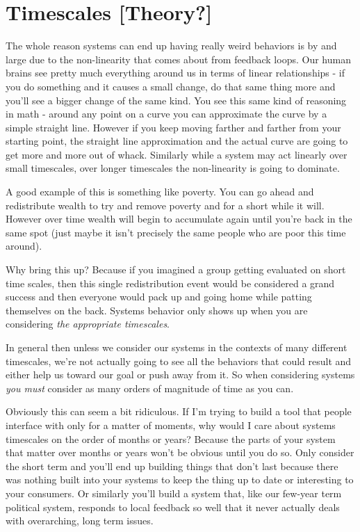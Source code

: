 \documentclass[11pt,a5paper]{book}
\begin{document}
\section{Timescales [Theory?]}
The whole reason systems can end up having really weird behaviors is by and large due to the non-linearity that comes about from feedback loops. Our human brains see pretty much everything around us in terms of linear relationships - if you do something and it causes a small change, do that same thing more and you'll see a bigger change of the same kind. You see this same kind of reasoning in math - around any point on a curve you can approximate the curve by a simple straight line. However if you keep moving farther and farther from your starting point, the straight line approximation and the actual curve are going to get more and more out of whack. Similarly while a system may act linearly over small timescales, over longer timescales the non-linearity is going to dominate.
\newline

A good example of this is something like poverty. You can go ahead and redistribute wealth to try and remove poverty and for a short while it will. However over time wealth will begin to accumulate again until you're back in the same spot (just maybe it isn't precisely the same people who are poor this time around). 
\newline

Why bring this up? Because if you imagined a group getting evaluated on short time scales, then this single redistribution event would be considered a grand success and then everyone would pack up and going home while patting themselves on the back. Systems behavior only shows up when you are considering \textit{the appropriate timescales}. 
\newline

In general then unless we consider our systems in the contexts of many different timescales, we're not actually going to see all the behaviors that could result and either help us toward our goal or push away from it. So when considering systems \textit{you must} consider as many orders of magnitude of time as you can.
\newline

Obviously this can seem a bit ridiculous. If I'm trying to build a tool that people interface with only for a matter of moments, why would I care about systems timescales on the order of months or years? Because the parts of your system that matter over months or years won't be obvious until you do so. Only consider the short term and you'll end up building things that don't last because there was nothing built into your systems to keep the thing up to date or interesting to your consumers. Or similarly you'll build a system that, like our few-year term political system, responds to local feedback so well that it never actually deals with overarching, long term issues. 
\newline
\end{document}
